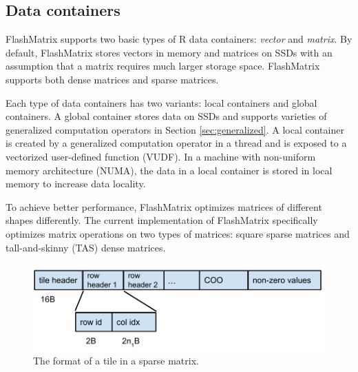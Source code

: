 \subsection{Data containers}
FlashMatrix supports two basic types of R data containers: \textit{vector}
and \textit{matrix}.
By default, FlashMatrix stores vectors in memory and matrices on SSDs with
an assumption that a matrix requires much larger storage space.
FlashMatrix supports both dense matrices and sparse matrices.

Each type of data containers has two variants: local containers and global
containers. A global container stores data on SSDs and supports varieties of
generalized computation operators in Section \ref{sec:generalized}. A local
container is created by a generalized computation operator in a thread and
is exposed to a vectorized user-defined function (VUDF). In a machine with
non-uniform memory architecture (NUMA), the data in a local container is stored
in local memory to increase data locality.

To achieve better performance, FlashMatrix optimizes matrices of different
shapes differently. The current implementation of FlashMatrix specifically
optimizes matrix operations on two types of matrices: square sparse matrices
and tall-and-skinny (TAS) dense matrices.


\begin{figure}
	\centering
	\includegraphics[scale=0.5]{./tile_format.pdf}
	\vspace{-5pt}
	\caption{The format of a tile in a sparse matrix.}
	\vspace{-5pt}
	\label{fig:tile}
\end{figure}

